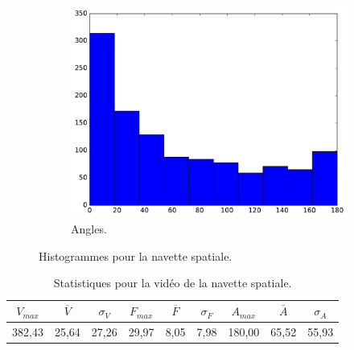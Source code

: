 \begin{appendices}
\begin{figure}[htbp]
\begin{subfigure}[t]{\subImgWclicks}
			\includegraphics[width=\textwidth]{figures/ch3/spaceA_angle}
			\caption{Angles.}
			\label{fig:spaceA_angle}
		\end{subfigure}
		\caption[Histogrammes pour la navette spatiale]{Histogrammes pour la navette spatiale.}
		\label{fig:histSpace}
	\end{figure}
	
\begin{table}
	\centering
	\begin{tabular}{c c c c c c c c c}
		$V_{max}$	& $\overline{V}$	& $\sigma_{V}$	& $F_{max}$	& $\overline{F}$	& $\sigma_{F}$	& $A_{max}$	& $\overline{A}$	& $\sigma_{A}$	\bigstrut[b] \\ \hline

		382,43		& 25,64				& 27,26			& 29,97		& 8,05				& 7,98			& 180,00	& 65,52				& 55,93			\bigstrut[t] \\
	\end{tabular}
	\caption[Statistiques pour la vidéo de la navette spatiale]{Statistiques pour la vidéo de la navette spatiale.}
	\label{tab:spaceA_stats}
\end{table}



\end{appendices}
